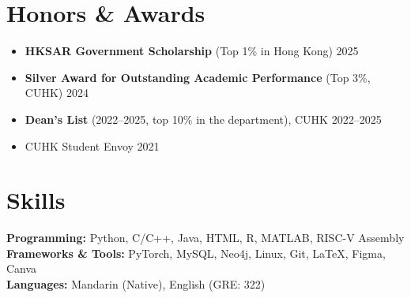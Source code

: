 \documentclass[a4paper,11pt]{article}
\begin{document}
\section{Honors \& Awards}

\begin{itemize}[itemsep=3pt]
  \item \textbf{HKSAR Government Scholarship} (Top 1\% in Hong Kong) \hfill 2025
  \item \textbf{Silver Award for Outstanding Academic Performance} (Top 3\%, CUHK) \hfill 2024
  \item \textbf{Dean's List} (2022--2025, top 10\% in the department), CUHK \hfill 2022--2025
  \item CUHK Student Envoy \hfill 2021
\end{itemize}

\section{Skills}

\textbf{Programming:} Python, C/C++, Java, HTML, R, MATLAB, RISC-V Assembly \\[2pt]
\textbf{Frameworks \& Tools:} PyTorch, MySQL, Neo4j, Linux, Git, \LaTeX, Figma, Canva \\[2pt]
\textbf{Languages:} Mandarin (Native), English (GRE: 322)


\end{document}
